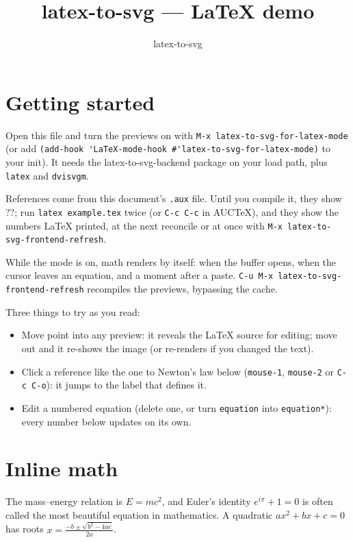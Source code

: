 \documentclass{article}
\title{latex-to-svg --- LaTeX demo}
\author{latex-to-svg}
\date{}
\begin{document}
\maketitle

\section{Getting started}
\label{sec:start}

Open this file and turn the previews on with
\verb|M-x latex-to-svg-for-latex-mode| (or add
\verb|(add-hook 'LaTeX-mode-hook #'latex-to-svg-for-latex-mode)| to your init).
It needs the latex-to-svg-backend package on your load path, plus
\verb|latex| and \verb|dvisvgm|.

References come from this document's \verb|.aux| file. Until you compile
it, they show ??; run \verb|latex example.tex| twice (or \verb|C-c C-c| in
AUCTeX), and they show the numbers LaTeX printed, at the next reconcile or at
once with \verb|M-x latex-to-svg-frontend-refresh|.

While the mode is on, math renders by itself: when the buffer opens, when the
cursor leaves an equation, and a moment after a paste.
\verb|C-u M-x latex-to-svg-frontend-refresh| recompiles the previews,
bypassing the cache.

Three things to try as you read:
\begin{itemize}
\item Move point into any preview: it reveals the LaTeX source for editing;
  move out and it re-shows the image (or re-renders if you changed the text).
\item Click a reference like the one to Newton's law below (\verb|mouse-1|,
  \verb|mouse-2| or \verb|C-c C-o|): it jumps to the label that defines it.
\item Edit a numbered equation (delete one, or turn \verb|equation| into
  \verb|equation*|): every number below updates on its own.
\end{itemize}

\section{Inline math}
\label{sec:inline}

The mass--energy relation is $E = mc^2$, and Euler's identity
$e^{i\pi} + 1 = 0$ is often called the most beautiful equation in
mathematics. A quadratic $ax^2 + bx + c = 0$ has roots
\( x = \frac{-b \pm \sqrt{b^2 - 4ac}}{2a} \).
\end{document}
